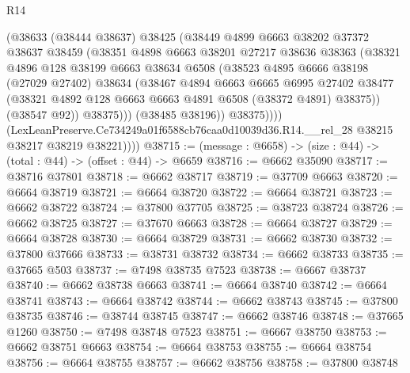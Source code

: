 \begin{lexlean}{R14}
\begin{coremodule}
                  (@38633
                    (@38444 @38637)
                    @38425
                    (@38449
                      @4899
                      @6663
                      @38202
                      @37372
                      @38637
                      @38459
                      (@38351
                        @4898
                        @6663
                        @38201
                        @27217
                        @38636
                        @38363
                        (@38321
                          @4896
                          @128
                          @38199
                          @6663
                          @38634
                          @6508
                          (@38523
                            @4895
                            @6666
                            @38198
                            (@27029 @27402)
                            @38634
                            (@38467
                              @4894
                              @6663
                              @6665
                              @6995
                              @27402
                              @38477
                              (@38321 @4892 @128 @6663 @6663 @4891 @6508 (@38372 @4891) @38375))
                            (@38547 @92))
                          @38375)))
                    (@38485 @38196))
                  @38375))))
          (LexLeanPreserve.Ce734249a01f6588cb76caa0d10039d36.R14.__rel_28
            @38215
            @38217
            @38219
            @38221))))
@38715 := (message : @6658) -> (size : @44) -> (total : @44) -> (offset : @44) -> @6659
@38716 := @6662 @35090
@38717 := @38716 @37801
@38718 := @6662 @38717
@38719 := @37709 @6663
@38720 := @6664 @38719
@38721 := @6664 @38720
@38722 := @6664 @38721
@38723 := @6662 @38722
@38724 := @37800 @37705
@38725 := @38723 @38724
@38726 := @6662 @38725
@38727 := @37670 @6663
@38728 := @6664 @38727
@38729 := @6664 @38728
@38730 := @6664 @38729
@38731 := @6662 @38730
@38732 := @37800 @37666
@38733 := @38731 @38732
@38734 := @6662 @38733
@38735 := @37665 @503
@38737 := @7498 @38735 @7523
@38738 := @6667 @38737
@38740 := @6662 @38738 @6663
@38741 := @6664 @38740
@38742 := @6664 @38741
@38743 := @6664 @38742
@38744 := @6662 @38743
@38745 := @37800 @38735
@38746 := @38744 @38745
@38747 := @6662 @38746
@38748 := @37665 @1260
@38750 := @7498 @38748 @7523
@38751 := @6667 @38750
@38753 := @6662 @38751 @6663
@38754 := @6664 @38753
@38755 := @6664 @38754
@38756 := @6664 @38755
@38757 := @6662 @38756
@38758 := @37800 @38748

\end{coremodule}
\end{lexlean}
